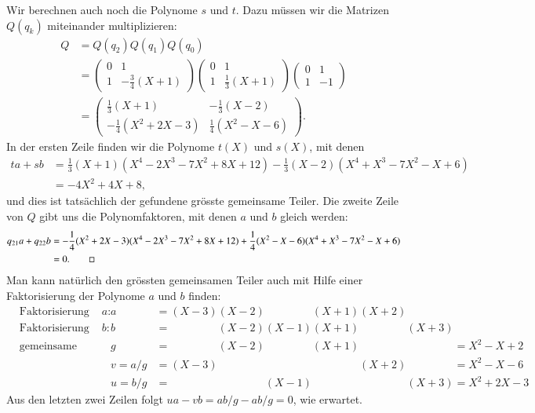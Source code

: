 \begin{beispiel}
Wir berechnen auch noch die Polynome $s$ und $t$.
Dazu müssen wir die Matrizen $Q(q_k)$ miteinander multiplizieren:
\begin{align*}
Q
&=Q(q_2) Q(q_1) Q(q_0)
\\
&=
\begin{pmatrix} 0 & 1 \\ 1 & -\frac34(X+1) \end{pmatrix}
\begin{pmatrix} 0 & 1 \\ 1 & \frac13(X+1) \end{pmatrix}
\begin{pmatrix} 0 & 1 \\ 1 & -1 \end{pmatrix}
\\
&=
\begin{pmatrix}
\frac13(X+1)&-\frac13(X-2)\\
-\frac14(X^2+2X-3)&\frac14(X^2-X-6)
\end{pmatrix}.
\end{align*}
In der ersten Zeile finden wir die Polynome $t(X)$ und $s(X)$, mit denen
\begin{align*}
ta+sb
&=
\frac13(X+1)
(X^4-2X^3-7X^2+8X+12)
-\frac13(X-2)
(X^4+X^3-7X^2-X+6)
\\
&=
-4X^2+4X+8,
\end{align*}
und dies ist tatsächlich der gefundene grösste gemeinsame Teiler.
Die zweite Zeile von $Q$ gibt uns die Polynomfaktoren, mit denen
$a$ und $b$ gleich werden:
\begin{align*}
q_{21}a+q_{22}b
&=
-\frac14(X^2+2X-3)
(X^4-2X^3-7X^2+8X+12)
+\frac14(X^2-X-6)
(X^4+X^3-7X^2-X+6)
\\
&=0.
\qedhere
\end{align*}
Man kann natürlich den grössten gemeinsamen Teiler auch mit Hilfe einer
Faktorisierung der Polynome $a$ und $b$ finden:
\begin{align*}
&\text{Faktorisierung von $a$:}&
a  &=         (X-3) (X-2)\phantom{(X-1)}(X+1)         (X+2) \phantom{(X+3)}\\
&\text{Faktorisierung von $b$:}&
b  &=\phantom{(X-3)}(X-2)         (X-1) (X+1)\phantom{(X+2)}         (X+3) \\
&\text{gemeinsame Faktoren:}&
g  &=\phantom{(X-3)}(X-2)\phantom{(X-1)}(X+1)\phantom{(X+2)}\phantom{(X+3)}
    = X^2 -X + 2\\
&&
v=a/g&=         (X-3)\phantom{(X-2)(X-1)(X+1)} (X+2) \phantom{(X+3)}
    = X^2-X-6 \\
&&
u=b/g&=\phantom{(X-3)(X-2)} (X-1)\phantom{(X+1)(X+2)}(X+3)
    = X^2+2X-3
\end{align*}
Aus den letzten zwei Zeilen folgt
$ua-vb = ab/g - ab/g = 0$, wie erwartet.
\end{beispiel}

